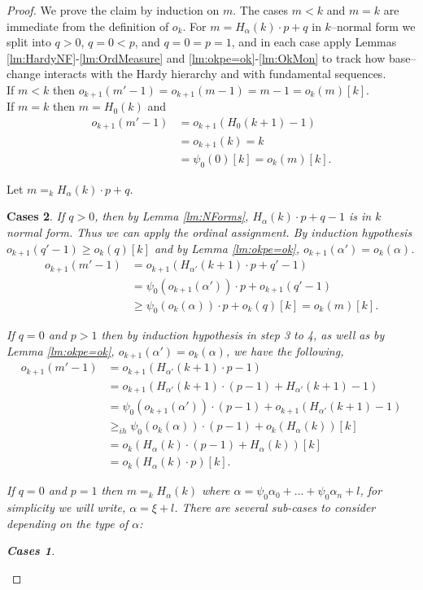 \documentclass[10pt,a4paper]{amsart}
\newtheorem{Cases}{Cases}
\newcommand{\al}{{\alpha}}
\newcommand{\ok}{o_{k}}
\newcommand{\okpe}{o_{k+1}}
\begin{document}
\begin{proof}
We prove the claim by induction on $m$. 
The cases $m<k$ and $m=k$ are immediate from the definition of $o_k$. For $m=H_\alpha(k)\cdot p+q$ in $k$–normal form we split into $q>0$, $q=0<p$, and $q=0=p=1$, and in each case apply Lemmas \ref{lm:HardyNF}-\ref{lm:OrdMeasure} and \ref{lm:okpe=ok}-\ref{lm:OkMon} to track how base–change interacts with the Hardy hierarchy and with fundamental sequences.
\\
If  $m<k$ then $\okpe(m'-1) = \okpe(m-1)=m-1= \ok(m)[k]$.
\\
If $m=k$ then $m= H_0(k)$ and 
\begin{align*} 
    \okpe(m'-1)& =\okpe(H_{0} (k+1) -1)\\
    &= \okpe(k ) =k \\
    &= \psi_0(0)[k]=\ok(m)[k].
\end{align*}

Let $m=_k H_\al(k)\cdot p +q$.
\begin{Cases}
\item If $q>0$, then by Lemma \ref{lm:NForms}, $H_\al(k) \cdot p+ q-1$ is in $k$ normal form. Thus we can apply the ordinal assignment. By induction hypothesis $ \okpe(q'-1) \geq \ok(q)[k]$ and by Lemma \ref{lm:okpe=ok}, $\okpe(\al') = \ok(\al)$.
\begin{align*} 
        \okpe(m'-1)& =\okpe(H_{\al'} (k+1) \cdot p + q'-1)\\
        & =\psi_0(\okpe(\al'))\cdot p + \okpe(q'-1)\\
        &\geq \psi_0(\ok(\al))\cdot p + \ok(q)[k]=\ok(m)[k].
\end{align*}

\item If $q=0$ and $p>1$ then by induction hypothesis in step 3 to 4, as well as by Lemma \ref{lm:okpe=ok}, $\okpe(\al')=\ok(\al)$, we have the following,
    \begin{align*} 
            \okpe(m'-1)& =\okpe(H_{\al'}(k+1) \cdot p - 1)\\
            &= \okpe(H_{\al'}(k+1) \cdot (p-1) + H_{\al'}(k+1)-1)\\
            & =\psi_0(\okpe(\al')) \cdot (p-1) + \okpe(H_{\al'}(k+1)-1)\\
            &\geq_{ih}  \psi_0(\ok(\al))\cdot (p-1)  + \ok(H_\al (k))[k]\\
            &= \ok(H_\al(k)\cdot (p-1) + H_\al (k))[k] \\
            &=\ok(H_\al(k)\cdot p)[k].
        \end{align*}      
\item If $q=0$ and $p=1$ then $m=_k H_\al(k)$ where $\al = \psi_0\al_0 +... +\psi_0\al_n+l$, for simplicity we will write, $\al = \xi + l$.
There are several sub-cases to consider depending on the type of $\al$:
\begin{Cases}
        

\end{Cases}
\end{Cases}
\end{proof}
\end{document}
